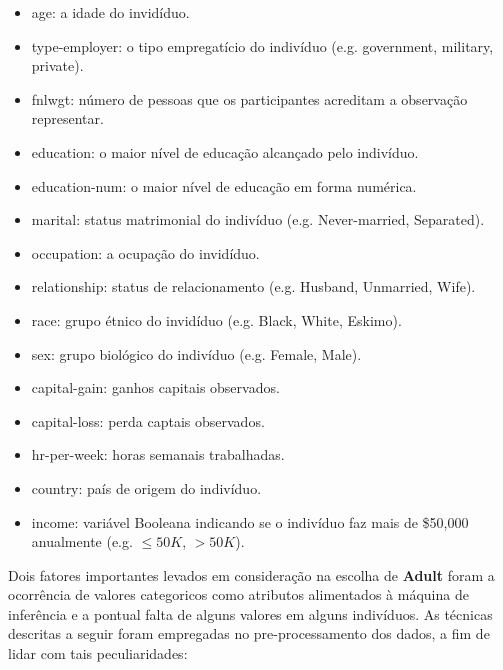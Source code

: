 \documentclass[12pt]{report}
\begin{document}
\begin{itemize}
	\item age: a idade do invidíduo.
	\item type-employer: o tipo empregatício do indivíduo (e.g. government, military, private).
	\item fnlwgt: número de pessoas que os participantes acreditam a observação representar.
	\item education: o maior nível de educação alcançado pelo indivíduo.
	\item education-num: o maior nível de educação em forma numérica.
	\item marital: status matrimonial do indivíduo (e.g. Never-married, Separated).
	\item occupation: a ocupação do invidíduo.
	\item relationship: status de relacionamento (e.g. Husband, Unmarried, Wife).
	\item race: grupo étnico do invidíduo (e.g. Black, White, Eskimo).
	\item sex: grupo biológico do indivíduo (e.g. Female, Male).
	\item capital-gain: ganhos capitais observados.
	\item capital-loss: perda captais observados.
	\item hr-per-week: horas semanais trabalhadas.
	\item country: país de origem do indivíduo.
	\item income: variável Booleana indicando se o indivíduo faz mais
	de \$50,000 anualmente (e.g. $\le 50K$, $>50K$).
\end{itemize}
		
Dois fatores importantes levados em consideração na escolha de \textbf{Adult} foram a ocorrência de valores categoricos como atributos alimentados à máquina de inferência e a pontual falta de alguns valores em alguns indivíduos. As técnicas descritas a seguir foram empregadas no pre-processamento dos dados, a fim de lidar com tais peculiaridades:
		
\end{document}
